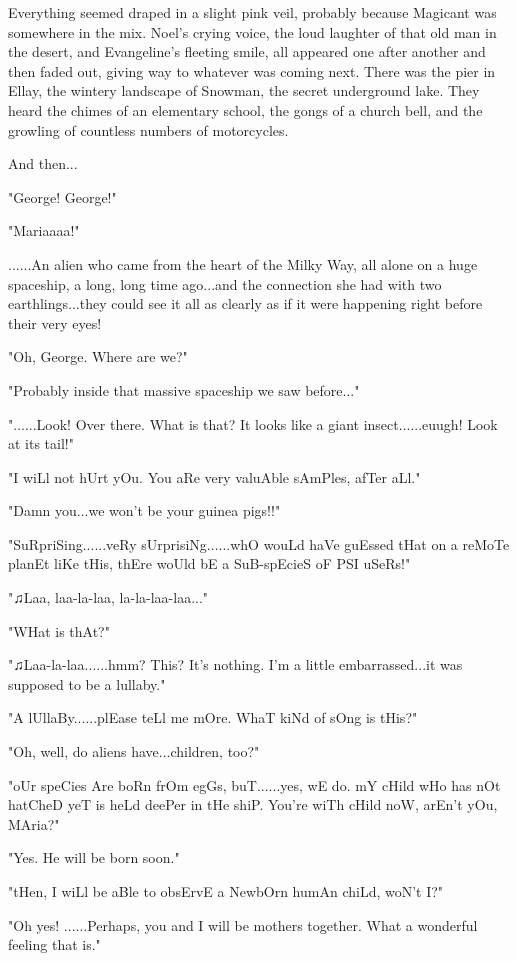 \documentclass[
]{article}
\begin{document}
Everything seemed draped in a slight pink veil, probably because
Magicant was somewhere in the mix. Noel's crying voice, the loud
laughter of that old man in the desert, and Evangeline's fleeting smile,
all appeared one after another and then faded out, giving way to
whatever was coming next. There was the pier in Ellay, the wintery
landscape of Snowman, the secret underground lake. They heard the chimes
of an elementary school, the gongs of a church bell, and the growling of
countless numbers of motorcycles.

And then...

"George! George!"

"Mariaaaa!"

......An alien who came from the heart of the Milky Way, all alone on a
huge spaceship, a long, long time ago...and the connection she had with
two earthlings...they could see it all as clearly as if it were
happening right before their very eyes!

"Oh, George. Where are we?"

"Probably inside that massive spaceship we saw before..."

"......Look! Over there. What is that? It looks like a giant
insect......euugh! Look at its tail!"

"I wiLl not hUrt yOu. You aRe very valuAble sAmPles, afTer aLl."

"Damn you...we won't be your guinea pigs!!"

"SuRpriSing......veRy sUrprisiNg......whO wouLd haVe guEssed tHat on a
reMoTe planEt liKe tHis, thEre woUld bE a SuB-spEcieS oF PSI uSeRs!"

"♫Laa, laa-la-laa, la-la-laa-laa..."

"WHat is thAt?"

"♫Laa-la-laa......hmm? This? It's nothing. I'm a little embarrassed...it
was supposed to be a lullaby."

"A lUllaBy......plEase teLl me mOre. WhaT kiNd of sOng is tHis?"

"Oh, well, do aliens have...children, too?"

"oUr speCies Are boRn frOm egGs, buT......yes, wE do. mY cHild wHo has
nOt hatCheD yeT is heLd deePer in tHe shiP. You're wiTh cHild noW,
arEn't yOu, MAria?"

"Yes. He will be born soon."

"tHen, I wiLl be aBle to obsErvE a NewbOrn humAn chiLd, woN't I?"

"Oh yes! ......Perhaps, you and I will be mothers together. What a
wonderful feeling that is."
\end{document}
